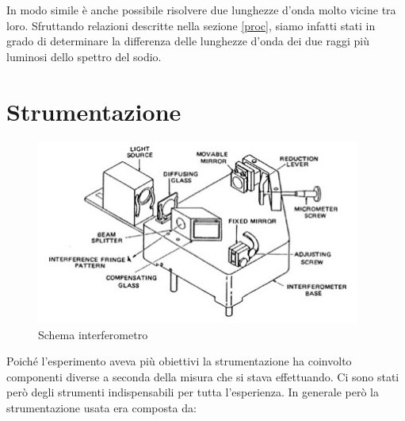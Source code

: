 \documentclass[a4paper,11pt]{article}
\begin{document}
	In modo simile è anche possibile risolvere due lunghezze d'onda molto vicine tra loro. Sfruttando relazioni descritte nella sezione \ref{proc}, siamo infatti stati in grado di determinare la differenza delle lunghezze d'onda dei due raggi più luminosi dello spettro del sodio.
	
	


	\section{Strumentazione} \label{strum}
\begin{figure}
	\caption{Schema interferometro}\label{interf}
	\centering
	\includegraphics[width=0.95\textwidth]{interf}
\end{figure}
Poiché l'esperimento aveva più obiettivi la strumentazione ha coinvolto componenti diverse a seconda della misura che si stava effettuando. Ci sono stati però degli strumenti indispensabili per tutta l'esperienza. In generale però la strumentazione usata era composta da:
\end{document}
